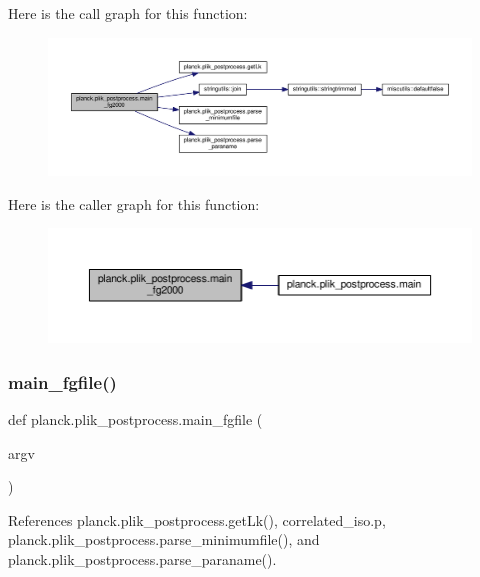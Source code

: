 Here is the call graph for this function\+:
\nopagebreak
\begin{figure}[H]
\begin{center}
\leavevmode
\includegraphics[width=350pt]{namespaceplanck_1_1plik__postprocess_a81625cf708d7a89aad8e0aba301d99b6_cgraph}
\end{center}
\end{figure}
Here is the caller graph for this function\+:
\nopagebreak
\begin{figure}[H]
\begin{center}
\leavevmode
\includegraphics[width=350pt]{namespaceplanck_1_1plik__postprocess_a81625cf708d7a89aad8e0aba301d99b6_icgraph}
\end{center}
\end{figure}
\mbox{\label{namespaceplanck_1_1plik__postprocess_a3cd097f3d46e5e0635b5d5d6b738631c}} 
\subsubsection{\texorpdfstring{main\+\_\+fgfile()}{main\_fgfile()}}
{\footnotesize\ttfamily def planck.\+plik\+\_\+postprocess.\+main\+\_\+fgfile (\begin{DoxyParamCaption}\item[{}]{argv }\end{DoxyParamCaption})}



References planck.\+plik\+\_\+postprocess.\+get\+Lk(), correlated\+\_\+iso.\+p, planck.\+plik\+\_\+postprocess.\+parse\+\_\+minimumfile(), and planck.\+plik\+\_\+postprocess.\+parse\+\_\+paraname().



